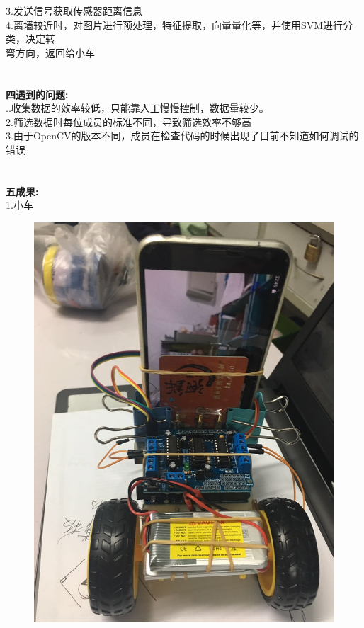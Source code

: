 \documentclass[19pt,a4paper]{article}
\begin{document}
\indent 3.发送信号获取传感器距离信息\\
\indent 4.离墙较近时，对图片进行预处理，特征提取，向量量化等，并使用SVM进行分类，决定转\\
\indent 弯方向，返回给小车\\
\\
\\
\indent\textbf{四\quad 遇到的问题:}\\
..收集数据的效率较低，只能靠人工慢慢控制，数据量较少。\\
\indent 2.筛选数据时每位成员的标准不同，导致筛选效率不够高\\
\indent 3.由于OpenCV的版本不同，成员在检查代码的时候出现了目前不知道如何调试的错误\\
\\
\\
\indent\textbf{五\quad 成果:}\\
\indent 1.小车
\begin{figure}[H]
 \centering
 \includegraphics[scale=0.2]{2.jpeg}
\end{figure}
\end{document}
